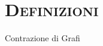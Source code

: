 \documentclass[xcolor=x11names,compress]{beamer}
\begin{document}
\section{\scshape Definizioni}
{
\begin{frame}[t]{Contrazione di Grafi}
    \vspace*{-0.65cm}
    \begin{minipage}[t]{\textwidth}
        
        \hfill
        
    \end{minipage}
\end{frame}}
\end{document}
